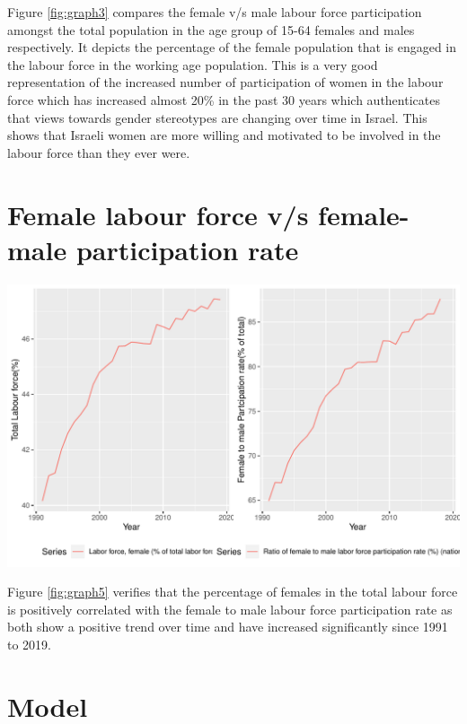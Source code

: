 \documentclass[11pt,a4paper,]{article}
\let\origfigure\figure
\let\endorigfigure\endfigure
\renewenvironment{figure}[1][2] {
    \expandafter\origfigure\expandafter[H]
} {
    \endorigfigure
}%
\begin{document}
Figure \ref{fig:graph3} compares the female v/s male labour force
participation amongst the total population in the age group of 15-64
females and males respectively. It depicts the percentage of the female
population that is engaged in the labour force in the working age
population. This is a very good representation of the increased number
of participation of women in the labour force which has increased almost
20\% in the past 30 years which authenticates that views towards gender
stereotypes are changing over time in Israel. This shows that Israeli
women are more willing and motivated to be involved in the labour force
than they ever were.

\section{Female labour force v/s female-male participation
rate}\label{female-labour-force-vs-female-male-participation-rate}

\begin{figure}
\centering
\includegraphics{report_files/figure-latex/graph5-1.pdf}
\caption{\label{fig:graph5}Comparing female labour force with female-male
participation rate}
\end{figure}

Figure \ref{fig:graph5} verifies that the percentage of females in the
total labour force is positively correlated with the female to male
labour force participation rate as both show a positive trend over time
and have increased significantly since 1991 to 2019.

\section*{Model}
\end{document}
